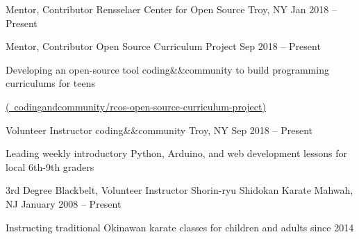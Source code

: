 


\begin{cventries}

  \cventry
  {Mentor, Contributor}
  {Rensselaer Center for Open Source}
  {Troy, NY}
  {Jan 2018 -- Present}
  {
    \vspace*{-1\abovedisplayskip}
    \begin{cvsubentries}
      \cvsubentry
      {Mentor, Contributor}
      {Open Source Curriculum Project}
      {Sep 2018 -- Present}
      {
        \begin{cvitems}
          \item Developing an open-source tool coding\&\&community to build programming curriculums for teens
          \item[] \href{https://github.com/codingandcommunity/rcos-open-source-curriculum-project}{(\faGithubSquare\ codingandcommunity/rcos-open-source-curriculum-project)}
        \end{cvitems}
      }
    \end{cvsubentries}
    \vspace*{-1\belowdisplayskip}
  }


  \cventry
  {Volunteer Instructor}
  {coding\&\&community}
  {Troy, NY}
  {Sep 2018 -- Present}
  {
    \begin{cvitems}
      \item Leading weekly introductory Python, Arduino, and web development lessons for local 6th-9th graders
    \end{cvitems}
  }


  \cventry
  {3rd Degree Blackbelt, Volunteer Instructor}
  {Shorin-ryu Shidokan Karate}
  {Mahwah, NJ}
  {January 2008 -- Present}
  {
    \begin{cvitems}
      \item Instructing traditional Okinawan karate classes for children and adults since 2014
    \end{cvitems}
  }


\end{cventries}